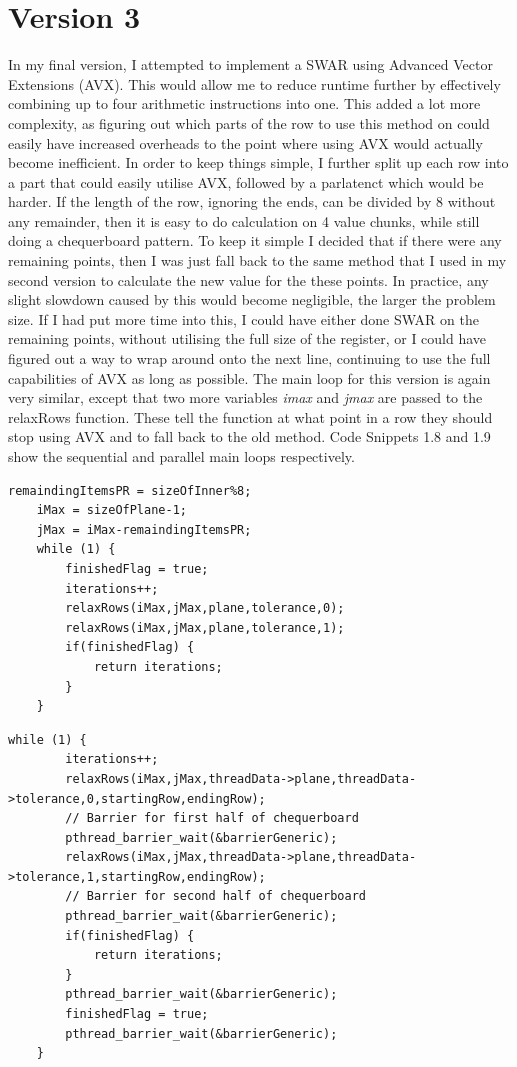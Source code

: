 \documentclass{report}
\begin{document}
\section{Version 3}
In my final version, I attempted to implement a SWAR using Advanced Vector Extensions (AVX). This would allow me to reduce runtime further by effectively combining up to four arithmetic instructions into one. This added a lot more complexity, as figuring out which parts of the row to use this method on could easily have increased overheads to the point where using AVX would actually become inefficient. In order to keep things simple, I further split up each row into a part that could easily utilise AVX, followed by a parlatenct which would be harder. If the length of the row, ignoring the ends, can be divided by 8 without any remainder, then it is easy to do calculation on 4 value chunks, while still doing a chequerboard pattern. To keep it simple I decided that if there were any remaining points, then I was just fall back to the same method that I used in my second version to calculate the new value for the these points. In practice, any slight slowdown caused by this would become negligible, the larger the problem size. If I had put more time into this, I could have either done SWAR on the remaining points, without utilising the full size of the register, or I could have figured out a way to wrap around onto the next line, continuing to use the full capabilities of AVX as long as possible. The main loop for this version is again very similar, except that two more variables \textit{imax} and \textit{jmax} are passed to the relaxRows function. These tell the function at what point in a row they should stop using AVX and to fall back to the old method. Code Snippets 1.8 and 1.9 show the sequential and parallel main loops respectively.
\pagebreak
\begin{lstlisting}[style=customc,caption=Version 3 Sequential Main Loop]
    remaindingItemsPR = sizeOfInner%8;
    iMax = sizeOfPlane-1;
    jMax = iMax-remaindingItemsPR;
    while (1) {
        finishedFlag = true;
        iterations++;
        relaxRows(iMax,jMax,plane,tolerance,0);
        relaxRows(iMax,jMax,plane,tolerance,1);
        if(finishedFlag) {
            return iterations;
        }
    }
\end{lstlisting}
\begin{lstlisting}[style=customc,caption=Version 3 Parallel Main Loop]
   while (1) {
        iterations++;
        relaxRows(iMax,jMax,threadData->plane,threadData->tolerance,0,startingRow,endingRow);
        // Barrier for first half of chequerboard
        pthread_barrier_wait(&barrierGeneric);        
        relaxRows(iMax,jMax,threadData->plane,threadData->tolerance,1,startingRow,endingRow);
        // Barrier for second half of chequerboard
        pthread_barrier_wait(&barrierGeneric);
        if(finishedFlag) {
            return iterations;
        }
        pthread_barrier_wait(&barrierGeneric);
        finishedFlag = true;
        pthread_barrier_wait(&barrierGeneric);
    }
\end{lstlisting}
\end{document}
